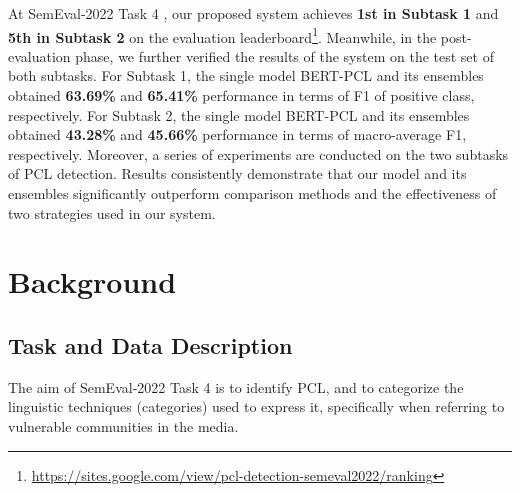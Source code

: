 \documentclass[11pt]{article}
\begin{document}
At SemEval-2022 Task 4 \citep{perezalmendros2022semeval}, our proposed system achieves \textbf{1st in Subtask 1} and \textbf{5th in Subtask 2} on the evaluation leaderboard\footnote{\url{https://sites.google.com/view/pcl-detection-semeval2022/ranking}}.
Meanwhile, in the post-evaluation phase, we further verified the results of the system on the test set of both subtasks. 
For Subtask 1, the single model BERT-PCL and its ensembles obtained \textbf{63.69\%} and \textbf{65.41\%} performance in terms of F1 of positive class, respectively.
For Subtask 2, the single model BERT-PCL and its ensembles obtained \textbf{43.28\%} and \textbf{45.66\%} performance in terms of macro-average F1, respectively.
Moreover, a series of experiments are conducted on the two subtasks of PCL detection. Results consistently demonstrate that our model and its ensembles significantly outperform comparison methods and the effectiveness of two strategies used in our system. 



















































\section{Background}
\subsection{Task and Data Description}


The aim of SemEval-2022 Task 4 \citep{perezalmendros2022semeval} is to identify PCL, and to categorize the linguistic techniques (categories) used to express it, specifically when referring to vulnerable communities in the media.
\end{document}
